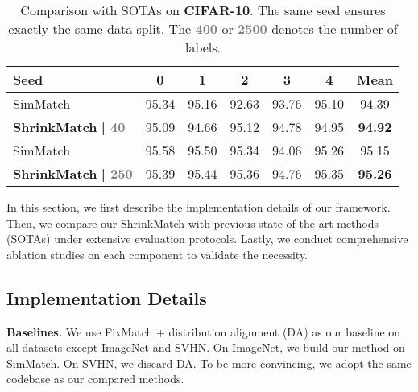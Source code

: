 \documentclass[10pt,twocolumn,letterpaper]{article}
\begin{document}
\begin{table}[t]
\centering
\small
\renewcommand{\arraystretch}{1.1}
\setlength\tabcolsep{1.1mm}
    \centering
    \begin{tabular}{l|ccccc|c}
    \toprule
    
    Seed & 0 & 1 & 2 & 3 & 4 & Mean \\
    
    \midrule
    
    SimMatch \cite{simmatch} & 95.34 & 95.16 & 92.63 & 93.76 & 95.10 & 94.39 \\
    
    \textbf{ShrinkMatch} \textbf{| \textcolor{gray}{{\footnotesize{40}}}} & 95.09 & 94.66 & 95.12 & 94.78 & 94.95 & \textbf{94.92} \\
    
    \midrule
    
    SimMatch \cite{simmatch} & 95.58 & 95.50 & 95.34 & 94.06 & 95.26 & 95.15 \\
    
    \textbf{ShrinkMatch} \textbf{| \textcolor{gray}{{\footnotesize{250}}}} & 95.39 & 95.44 & 95.36 & 94.76 & 95.35 & \textbf{95.26} \\
    
    \bottomrule

    \end{tabular}
    \vspace{-1mm}
    \caption{Comparison with SOTAs on \textbf{CIFAR-10}. The same seed ensures exactly the same data split. The \textcolor{gray}{\textbf{400}} or \textcolor{gray}{\textbf{2500}} denotes the number of labels.}
    \vspace{-2mm}
    \label{tab:cifar10}
\end{table} 

In this section, we first describe the implementation details of our framework. Then, we compare our ShrinkMatch with previous state-of-the-art methods (SOTAs) under extensive evaluation protocols. Lastly, we conduct comprehensive ablation studies on each component to validate the necessity.

\subsection{Implementation Details}

\vspace{1mm}
\noindent
\textbf{Baselines.}
We use FixMatch + distribution alignment (DA) as our baseline on all datasets except ImageNet and SVHN. On ImageNet, we build our method on SimMatch. On SVHN, we discard DA. To be more convincing, we adopt the same codebase as our compared methods.
\end{document}

